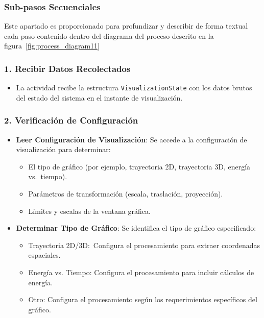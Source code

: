\subsubsection{Sub-pasos Secuenciales}
Este apartado es proporcionado para profundizar y describir de forma textual cada paso contenido dentro del diagrama del proceso descrito en la figura~\ref{fig:process_diagram11}
\subsubsection*{1. Recibir Datos Recolectados}
\begin{itemize}
    \item La actividad recibe la estructura \texttt{VisualizationState} con los datos brutos del estado del sistema en el instante de visualización.
\end{itemize}

\subsubsection*{2. Verificación de Configuración}
\begin{itemize}
    \item \textbf{Leer Configuración de Visualización}: Se accede a la configuración de visualización para determinar:
    \begin{itemize}
        \item El tipo de gráfico (por ejemplo, trayectoria 2D, trayectoria 3D, energía vs.\ tiempo).
        \item Parámetros de transformación (escala, traslación, proyección).
        \item Límites y escalas de la ventana gráfica.
    \end{itemize}
    \item \textbf{Determinar Tipo de Gráfico}: Se identifica el tipo de gráfico especificado:
    \begin{itemize}
        \item Trayectoria 2D/3D:\ Configura el procesamiento para extraer coordenadas espaciales.
        \item Energía vs. Tiempo: Configura el procesamiento para incluir cálculos de energía.
        \item Otro: Configura el procesamiento según los requerimientos específicos del gráfico.
    \end{itemize}
\end{itemize}

